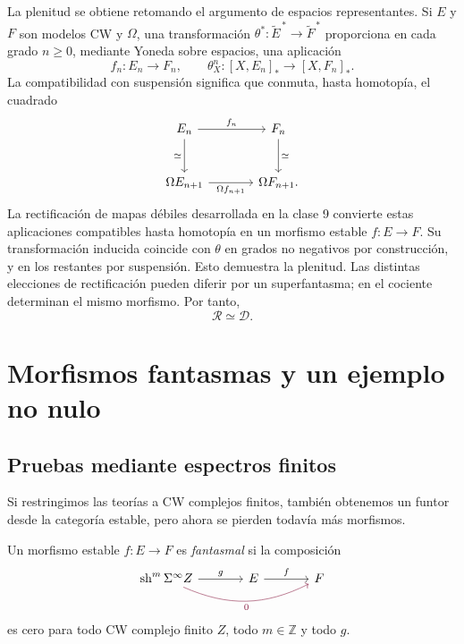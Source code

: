 La plenitud se obtiene retomando el argumento de espacios representantes. Si $E$ y $F$ son modelos CW y $\Omega$, una transformación $\theta^*\colon\widetilde E^{\,*}\to\widetilde F^{\,*}$ proporciona en cada grado $n\ge0$, mediante Yoneda sobre espacios, una aplicación
\[
f_n\colon E_n\longrightarrow F_n,
\qquad\theta^n_X\colon[X,E_n]_*\longrightarrow[X,F_n]_*.
\]
La compatibilidad con suspensión significa que conmuta, hasta homotopía, el cuadrado
\[
\begin{tikzcd}[column sep=large,row sep=large]
E_n\arrow[r,"f_n"]\arrow[d,"\simeq"']&F_n\arrow[d,"\simeq"]\\
\Omega E_{n+1}\arrow[r,"\Omega f_{n+1}"']&\Omega F_{n+1}.
\end{tikzcd}
\]
La rectificación de mapas débiles desarrollada en la clase 9 convierte estas aplicaciones compatibles hasta homotopía en un morfismo estable $f\colon E\to F$. Su transformación inducida coincide con $\theta$ en grados no negativos por construcción, y en los restantes por suspensión. Esto demuestra la plenitud. Las distintas elecciones de rectificación pueden diferir por un superfantasma; en el cociente determinan el mismo morfismo. Por tanto,
\[
\mathcal R\simeq\mathcal D.
\]

\section{Morfismos fantasmas y un ejemplo no nulo}

\subsection{Pruebas mediante espectros finitos}
Si restringimos las teorías a CW complejos finitos, también obtenemos un funtor desde la categoría estable, pero ahora se pierden todavía más morfismos.

\begin{defi}\label{defi:c20-fantasma}
Un morfismo estable $f\colon E\to F$ es \emph{fantasmal} si la composición
\[
\begin{tikzcd}[column sep=large]
\sh^m\Sigma^\infty Z\arrow[r,"g"]
\arrow[rr,bend right=25,"0"',color=rojoDiagramaCIMAT]
&E\arrow[r,"f"]&F
\end{tikzcd}
\]
es cero para todo CW complejo finito $Z$, todo $m\in\mathbb Z$ y todo $g$.
\end{defi}

